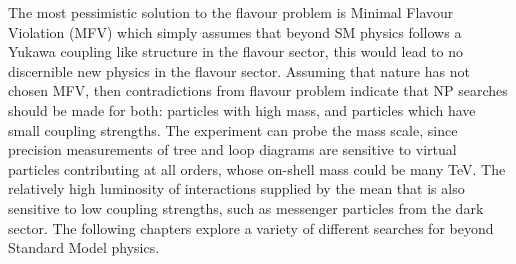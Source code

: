 The most pessimistic solution to the flavour problem is Minimal Flavour Violation (MFV)
which simply assumes that beyond SM physics follows a Yukawa coupling like structure in the flavour
sector, this would lead to no discernible new physics in the flavour sector.
Assuming that nature has not chosen MFV, then contradictions from flavour problem indicate that NP
searches should be made for both: particles
with high mass, and particles which have small coupling strengths.
The \lhcb experiment can probe the mass scale, since precision measurements of tree and loop
diagrams are sensitive to virtual particles contributing at all orders, whose on-shell mass could
be many TeV.
The relatively high luminosity of interactions supplied by the \lhc mean that \lhcb is also
sensitive to low coupling strengths, such as messenger particles from the dark sector.
The following chapters explore a variety of different searches for beyond Standard Model physics.




















